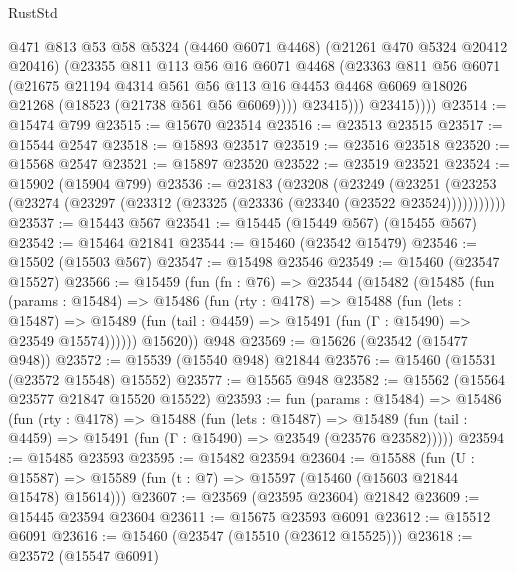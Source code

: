 \begin{lexlean}{RustStd}
\begin{coremodule}
                @471
                @813
                @53
                @58
                @5324
                (@4460 @6071 @4468)
                (@21261 @470 @5324 @20412 @20416)
                (@23355
                  @811
                  @113
                  @56
                  @16
                  @6071
                  @4468
                  (@23363
                    @811
                    @56
                    @6071
                    (@21675
                      @21194
                      @4314
                      @561
                      @56
                      @113
                      @16
                      @4453
                      @4468
                      @6069
                      @18026
                      @21268
                      (@18523 (@21738 @561 @56 @6069))))
                  @23415)))
            @23415))))
@23514 := @15474 @799
@23515 := @15670 @23514
@23516 := @23513 @23515
@23517 := @15544 @2547
@23518 := @15893 @23517
@23519 := @23516 @23518
@23520 := @15568 @2547
@23521 := @15897 @23520
@23522 := @23519 @23521
@23524 := @15902 (@15904 @799)
@23536 := @23183
    (@23208
      (@23249
        (@23251 (@23253 (@23274 (@23297 (@23312 (@23325 (@23336 (@23340 (@23522 @23524)))))))))))
@23537 := @15443 @567
@23541 := @15445 (@15449 @567) (@15455 @567)
@23542 := @15464 @21841
@23544 := @15460 (@23542 @15479)
@23546 := @15502 (@15503 @567)
@23547 := @15498 @23546
@23549 := @15460 (@23547 @15527)
@23566 := @15459
    (fun (fn : @76) =>
    @23544
      (@15482
        (@15485
          (fun (params : @15484) =>
          @15486
            (fun (rty : @4178) =>
            @15488
              (fun (lets : @15487) =>
              @15489 (fun (tail : @4459) => @15491 (fun (Γ : @15490) => @23549 @15574))))))
        @15620))
    @948
@23569 := @15626 (@23542 (@15477 @948))
@23572 := @15539 (@15540 @948) @21844
@23576 := @15460 (@15531 (@23572 @15548) @15552)
@23577 := @15565 @948
@23582 := @15562 (@15564 @23577 @21847 @15520 @15522)
@23593 := fun (params : @15484) =>
  @15486
    (fun (rty : @4178) =>
    @15488
      (fun (lets : @15487) =>
      @15489 (fun (tail : @4459) => @15491 (fun (Γ : @15490) => @23549 (@23576 @23582)))))
@23594 := @15485 @23593
@23595 := @15482 @23594
@23604 := @15588
    (fun (U : @15587) => @15589 (fun (t : @7) => @15597 (@15460 (@15603 @21844 @15478) @15614)))
@23607 := @23569 (@23595 @23604) @21842
@23609 := @15445 @23594 @23604
@23611 := @15675 @23593 @6091
@23612 := @15512 @6091
@23616 := @15460 (@23547 (@15510 (@23612 @15525)))
@23618 := @23572 (@15547 @6091)

\end{coremodule}
\end{lexlean}
